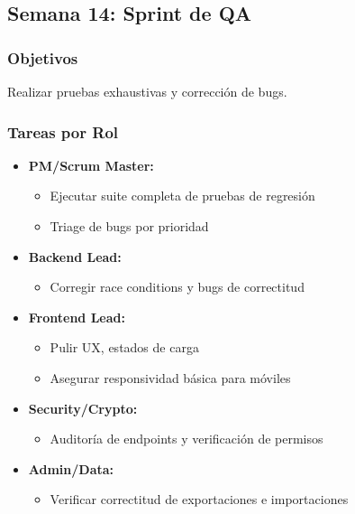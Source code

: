 \documentclass[12pt,a4paper]{article}
\begin{document}
\subsection{Semana 14: Sprint de QA}

\subsubsection{Objetivos}
Realizar pruebas exhaustivas y corrección de bugs.

\subsubsection{Tareas por Rol}

\begin{itemize}[leftmargin=*]
    \item \textbf{PM/Scrum Master:}
    \begin{itemize}
        \item Ejecutar suite completa de pruebas de regresión
        \item Triage de bugs por prioridad
    \end{itemize}
    
    \item \textbf{Backend Lead:}
    \begin{itemize}
        \item Corregir race conditions y bugs de correctitud
    \end{itemize}
    
    \item \textbf{Frontend Lead:}
    \begin{itemize}
        \item Pulir UX, estados de carga
        \item Asegurar responsividad básica para móviles
    \end{itemize}
    
    \item \textbf{Security/Crypto:}
    \begin{itemize}
        \item Auditoría de endpoints y verificación de permisos
    \end{itemize}
    
    \item \textbf{Admin/Data:}
    \begin{itemize}
        \item Verificar correctitud de exportaciones e importaciones
    \end{itemize}
\end{itemize}
\end{document}
